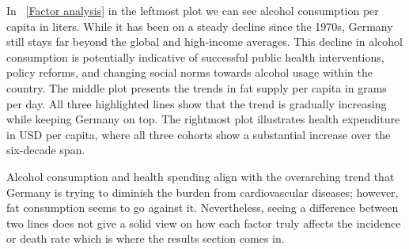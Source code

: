 In \figurename~\ref{Factor analysis} in the leftmost plot we can see alcohol consumption per capita in liters. While it has been on a steady decline since the 1970s, Germany still stays far beyond the global and high-income averages. This decline in alcohol consumption is potentially indicative of successful public health interventions, policy reforms, and changing social norms towards alcohol usage within the country. The middle plot presents the trends in fat supply per capita in grams per day. All three highlighted lines show that the trend is gradually increasing while keeping Germany on top. The rightmost plot illustrates health expenditure in USD per capita, where all three cohorts show a substantial increase over the six-decade span.

Alcohol consumption and health spending align with the overarching trend that Germany is trying to diminish the burden from cardiovascular diseases; however, fat consumption seems to go against it. Nevertheless, seeing a difference between two lines does not give a solid view on how each factor truly affects the incidence or death rate which is where the results section comes in.
